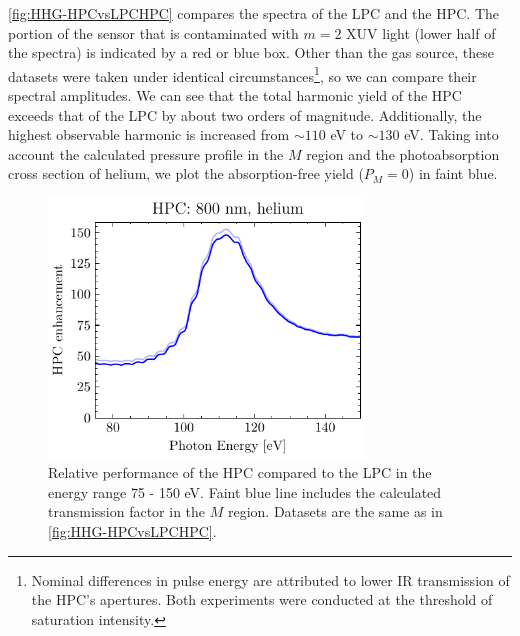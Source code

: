 
\cref{fig:HHG-HPCvsLPCHPC} compares the spectra of the LPC and the HPC. The portion of the sensor that is contaminated with $m=2$ XUV light (lower half of the spectra) is indicated by a red or blue box. Other than the gas source, these datasets were taken under identical circumstances\footnote{Nominal differences in pulse energy are attributed to lower IR transmission of the HPC's apertures. Both experiments were conducted at the threshold of saturation intensity.}, so we can compare their spectral amplitudes. We can see that the total harmonic yield of the HPC exceeds that of the LPC by about two orders of magnitude. Additionally, the highest observable harmonic is increased from $\sim 110$ eV to $\sim 130$ eV.  Taking into account the calculated pressure profile in the $M$ region and the photoabsorption cross section of helium, we plot the absorption-free yield ($P_M =0$) in faint blue.

\begin{figure}
	\centering
	\includegraphics[width=0.75\textwidth]{figures/chap3/HPC_He800nm_enhancement.pdf}
	\caption{Relative performance of the HPC compared to the LPC in the energy range 75 - 150 eV. Faint blue line includes the calculated transmission factor in the $M$ region. Datasets are the same as in \cref{fig:HHG-HPCvsLPCHPC}.}
	\label{fig:HPC_He800nm_enhancement}
\end{figure}

